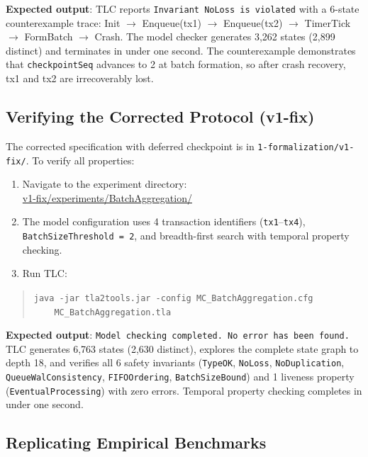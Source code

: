 \textbf{Expected output}: TLC reports \texttt{Invariant NoLoss is violated}
with a 6-state counterexample trace: Init $\rightarrow$ Enqueue(tx1)
$\rightarrow$ Enqueue(tx2) $\rightarrow$ TimerTick $\rightarrow$ FormBatch
$\rightarrow$ Crash. The model checker generates 3,262 states (2,899
distinct) and terminates in under one second. The counterexample
demonstrates that \texttt{checkpointSeq} advances to 2 at batch formation,
so after crash recovery, tx1 and tx2 are irrecoverably lost.

\subsection{Verifying the Corrected Protocol (v1-fix)}

The corrected specification with deferred checkpoint is in
\texttt{1-formalization/v1-fix/}. To verify all properties:

\begin{enumerate}
\item Navigate to the experiment directory:\\
  \url{v1-fix/experiments/BatchAggregation/}
\item The model configuration uses 4 transaction identifiers
  (\texttt{tx1}--\texttt{tx4}), \texttt{BatchSizeThreshold~=~2},
  and breadth-first search with temporal property checking.
\item Run TLC:
\end{enumerate}

\begin{quote}
\small
\texttt{java -jar tla2tools.jar -config MC\_BatchAggregation.cfg}\\
\texttt{~~~~MC\_BatchAggregation.tla}
\end{quote}

\textbf{Expected output}: \texttt{Model checking completed. No error has
been found.} TLC generates 6,763 states (2,630 distinct), explores the
complete state graph to depth 18, and verifies all 6 safety invariants
(\texttt{TypeOK}, \texttt{NoLoss}, \texttt{NoDuplication},
\texttt{QueueWalConsistency}, \texttt{FIFOOrdering},
\texttt{BatchSizeBound}) and 1 liveness property
(\texttt{EventualProcessing}) with zero errors. Temporal property checking
completes in under one second.

\subsection{Replicating Empirical Benchmarks}

